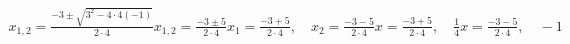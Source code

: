 \documentclass[preview]{standalone}
\begin{document}
\begin{align*}
x_{1,2} = \frac{-3 \pm \sqrt{3^2 - 4 \cdot 4(-1)}}{2 \cdot 4} x_{1,2} = \frac{-3 \pm 5}{2 \cdot 4} x_1 = \frac{-3 + 5}{2 \cdot 4}, \quad x_2 = \frac{-3 - 5}{2 \cdot 4} x = \frac{-3 + 5}{2 \cdot 4}, \quad \frac{1}{4} x = \frac{-3 - 5}{2 \cdot 4}, \quad -1
\end{align*}
\end{document}
